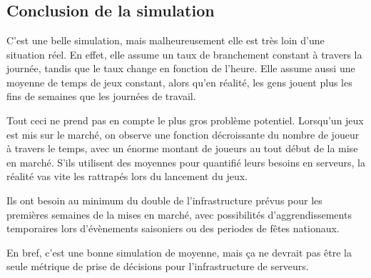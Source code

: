 \documentclass[11pt]{article}
\begin{document}
    \begin{center}
    \end{center}
    { \hspace*{\fill} \\}
    
    \begin{center}
    \end{center}
    { \hspace*{\fill} \\}
    
    \begin{center}
    \end{center}
    { \hspace*{\fill} \\}
    
    \subsection{Conclusion de la
simulation}\label{conclusion-de-la-simulation}

C'est une belle simulation, mais malheureusement elle est très loin
d'une situation réel. En effet, elle assume un taux de branchement
constant à travers la journée, tandis que le taux change en fonction de
l'heure. Elle assume aussi une moyenne de temps de jeux constant, alors
qu'en réalité, les gens jouent plus les fins de semaines que les
journées de travail.

Tout ceci ne prend pas en compte le plus gros problème potentiel.
Lorsqu'un jeux est mis sur le marché, on observe une fonction
décroissante du nombre de joueur à travers le temps, avec un énorme
montant de joueurs au tout début de la mise en marché. S'ils utilisent
des moyennes pour quantifié leurs besoins en serveurs, la réalité vas
vite les rattrapés lors du lancement du jeux.

Ils ont besoin au minimum du double de l'infrastructure prévus pour les
premières semaines de la mises en marché, avec possibilités
d'aggrendissements temporaires lors d'évènements saisoniers ou des
periodes de fêtes nationaux.

En bref, c'est une bonne simulation de moyenne, mais ça ne devrait pas
être la seule métrique de prise de décisions pour l'infrastructure de
serveurs.


    
    
    
\end{document}

